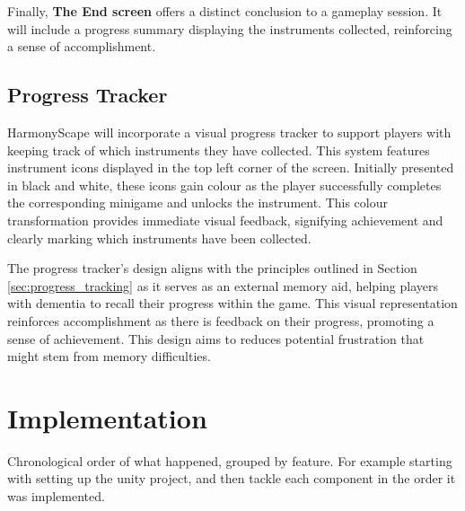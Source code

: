 \documentclass{l4proj}
\begin{document}
Finally, \textbf{The End screen} offers a distinct conclusion to a gameplay session. It will include a progress summary displaying the instruments collected, reinforcing a sense of accomplishment.

\section{Progress Tracker}
HarmonyScape will incorporate a visual progress tracker to support players with keeping track of which instruments they have collected. This system features instrument icons displayed in the top left corner of the screen. Initially presented in black and white, these icons gain colour as the player successfully completes the corresponding minigame and unlocks the instrument. This colour transformation provides immediate visual feedback, signifying achievement and clearly marking which instruments have been collected.

The progress tracker's design aligns with the principles outlined in Section \ref{sec:progress_tracking} as it serves as an external memory aid, helping players with dementia to recall their progress within the game. This visual representation reinforces accomplishment as there is feedback on their progress, promoting a sense of achievement. This design aims to reduces potential frustration that might stem from memory difficulties. 

\chapter{Implementation}

Chronological order of what happened, grouped by feature. For example starting with setting up the unity project, and then tackle each component in the order it was implemented.
\end{document}

